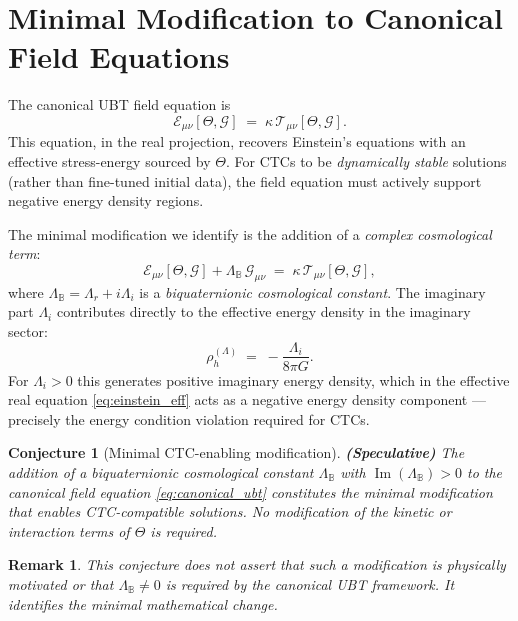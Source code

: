 \documentclass[12pt]{article}
\newtheorem{conjecture}{Conjecture}
\newtheorem{remark}{Remark}
\begin{document}
\section{Minimal Modification to Canonical Field Equations}
The canonical UBT field equation is
\begin{equation}
  \mathcal{E}_{\mu\nu}[\Theta,\mathcal{G}] \;=\;
  \kappa\,\mathcal{T}_{\mu\nu}[\Theta,\mathcal{G}].
  \label{eq:canonical_ubt}
\end{equation}
This equation, in the real projection, recovers Einstein's equations with
an effective stress-energy sourced by $\Theta$.  For CTCs to be
\emph{dynamically stable} solutions (rather than fine-tuned initial data),
the field equation must actively support negative energy density regions.

The minimal modification we identify is the addition of a
\emph{complex cosmological term}:
\begin{equation}
  \mathcal{E}_{\mu\nu}[\Theta,\mathcal{G}]
  + \Lambda_\mathbb{B}\,\mathcal{G}_{\mu\nu}
  \;=\;
  \kappa\,\mathcal{T}_{\mu\nu}[\Theta,\mathcal{G}],
  \label{eq:modified_ubt}
\end{equation}
where $\Lambda_\mathbb{B} = \Lambda_r + i\Lambda_i$ is a
\emph{biquaternionic cosmological constant}.  The imaginary part
$\Lambda_i$ contributes directly to the effective energy density in the
imaginary sector:
\begin{equation}
  \rho_h^{(\Lambda)} \;=\; -\frac{\Lambda_i}{8\pi G}.
\end{equation}
For $\Lambda_i > 0$ this generates positive imaginary energy density,
which in the effective real equation \eqref{eq:einstein_eff} acts as a
negative energy density component — precisely the energy condition
violation required for CTCs.

\begin{conjecture}[Minimal CTC-enabling modification]
\label{conj:minimal_mod}
\textbf{(Speculative)}  The addition of a biquaternionic cosmological
constant $\Lambda_\mathbb{B}$ with $\operatorname{Im}(\Lambda_\mathbb{B})
> 0$ to the canonical field equation \eqref{eq:canonical_ubt} constitutes
the minimal modification that enables CTC-compatible solutions.  No
modification of the kinetic or interaction terms of $\Theta$ is required.
\end{conjecture}

\begin{remark}
This conjecture does not assert that such a modification is physically
motivated or that $\Lambda_\mathbb{B} \neq 0$ is required by the canonical
UBT framework.  It identifies the minimal mathematical change.
\end{remark}
\end{document}
